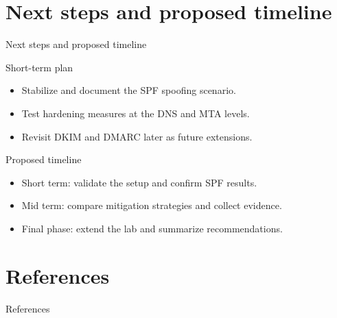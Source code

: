 \documentclass[aspectratio=169,10pt]{beamer}
\newcommand{\gitem}{\item[\textcolor{mintgreen}{\large\textbullet}]}
\begin{document}
\section{Next steps and proposed timeline}
\begin{frame}{Next steps and proposed timeline}
\begin{block}{Short-term plan}
\begin{itemize}
  \gitem Stabilize and document the SPF spoofing scenario.
  \vspace{0.5cm}
  \gitem Test hardening measures at the DNS and MTA levels.
  \vspace{0.5cm}
  \gitem Revisit DKIM and DMARC later as future extensions.
\end{itemize}
\end{block}

\vfill

\begin{block}{Proposed timeline}
\begin{itemize}
  \gitem Short term: validate the setup and confirm SPF results.
  \vspace{0.5cm}
  \gitem Mid term: compare mitigation strategies and collect evidence.
  \vspace{0.5cm}
  \gitem Final phase: extend the lab and summarize recommendations.
\end{itemize}
\end{block}
\end{frame}


\section{References}
\begin{frame}[allowframebreaks]{References}
	\nocite{*}
	
	
\end{frame}
\end{document}
